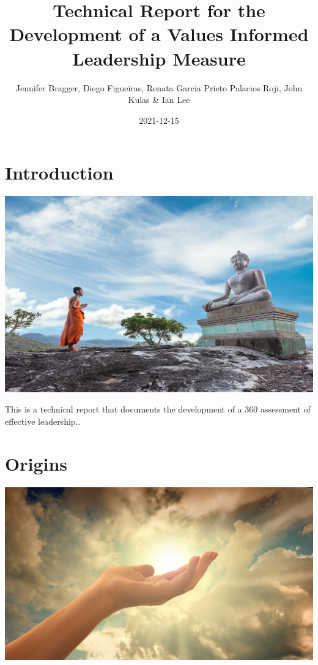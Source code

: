 \documentclass[
]{book}
\title{Technical Report for the Development of a Values Informed Leadership Measure}
\author{Jennifer Bragger, Diego Figueiras, Renata Garcia Prieto Palacios Roji, John Kulas \& Ian Lee}
\date{2021-12-15}
\begin{document}
\maketitle

{
\setcounter{tocdepth}{1}
\tableofcontents
}
\hypertarget{introduction}{%
\chapter{Introduction}\label{introduction}}

\includegraphics{monk-g0dbed9dae_1920.jpg}

This is a technical report that documents the development of a 360 assessment of effective leadership..

\hypertarget{origins}{%
\chapter{Origins}\label{origins}}

\includegraphics{religion-g96a8473e7_1920.jpg}
\end{document}

